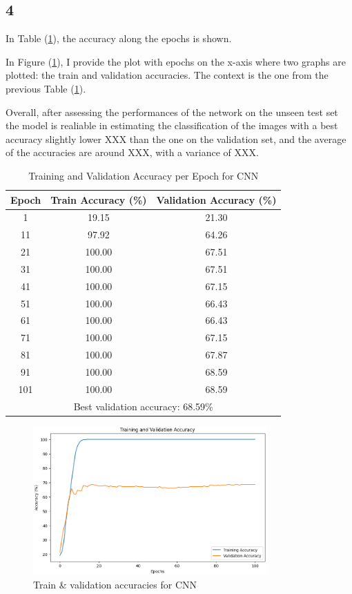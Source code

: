 \documentclass[11pt]{scrartcl}
\begin{document}
\subsection*{4}

In Table (\ref{tab:task2-accuracy}),
the accuracy along the epochs is shown.

In Figure (\ref{fig:task2-accuracy}), 
I provide the plot with epochs on the x-axis where two graphs are plotted:
the train and validation accuracies.
The context is the one from the previous Table (\ref{tab:task2-accuracy}). 

Overall, after assessing the performances of the network on the unseen test set
the model is realiable in estimating the classification of the images with
a best accuracy slightly lower XXX than the one on the validation set,
and the average of the accuracies are around XXX,
with a variance of XXX.

\begin{table}[htbp]
\centering
\caption{Training and Validation Accuracy per Epoch for CNN}
\begin{tabular}{ccc}
\toprule
\textbf{Epoch} & \textbf{Train Accuracy (\%)} & \textbf{Validation Accuracy (\%)} \\
\midrule
1    & 19.15 & 21.30 \\
11   & 97.92 & 64.26 \\
21   & 100.00 & 67.51 \\
31   & 100.00 & 67.51 \\
41   & 100.00 & 67.15 \\
51   & 100.00 & 66.43 \\
61   & 100.00 & 66.43 \\
71   & 100.00 & 67.15 \\
81   & 100.00 & 67.87 \\
91   & 100.00 & 68.59 \\
101  & 100.00 & 68.59 \\
\midrule
\multicolumn{3}{c}{Best validation accuracy: 68.59\%} \\
\bottomrule
\end{tabular}
\label{tab:task2-accuracy}
\end{table}

\begin{figure}[htbp]
\centering
\includegraphics[width=0.8\textwidth]{./figures/task2-accuracy.png}
\caption{Train \& validation accuracies for CNN}
\label{fig:task2-accuracy}
\end{figure}
\end{document}
